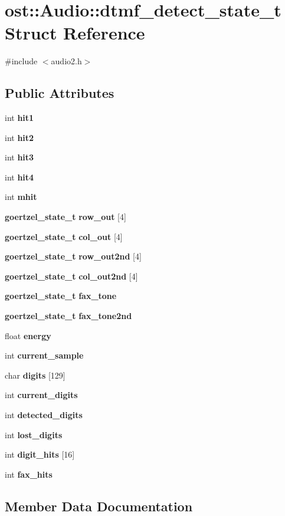 \section{ost::Audio::dtmf\_\-detect\_\-state\_\-t Struct Reference}
\label{structost_1_1_audio_1_1dtmf__detect__state__t}


{\ttfamily \#include $<$audio2.h$>$}\subsection*{Public Attributes}
\begin{DoxyCompactItemize}
\item 
int {\bf hit1}
\item 
int {\bf hit2}
\item 
int {\bf hit3}
\item 
int {\bf hit4}
\item 
int {\bf mhit}
\item 
{\bf goertzel\_\-state\_\-t} {\bf row\_\-out} [4]
\item 
{\bf goertzel\_\-state\_\-t} {\bf col\_\-out} [4]
\item 
{\bf goertzel\_\-state\_\-t} {\bf row\_\-out2nd} [4]
\item 
{\bf goertzel\_\-state\_\-t} {\bf col\_\-out2nd} [4]
\item 
{\bf goertzel\_\-state\_\-t} {\bf fax\_\-tone}
\item 
{\bf goertzel\_\-state\_\-t} {\bf fax\_\-tone2nd}
\item 
float {\bf energy}
\item 
int {\bf current\_\-sample}
\item 
char {\bf digits} [129]
\item 
int {\bf current\_\-digits}
\item 
int {\bf detected\_\-digits}
\item 
int {\bf lost\_\-digits}
\item 
int {\bf digit\_\-hits} [16]
\item 
int {\bf fax\_\-hits}
\end{DoxyCompactItemize}


\subsection{Member Data Documentation}
